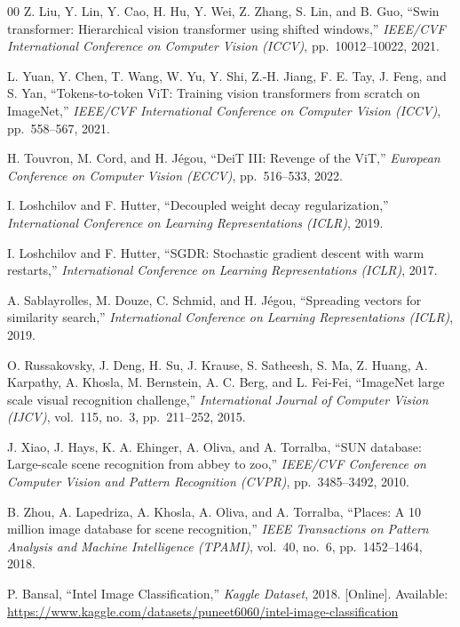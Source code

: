 \documentclass[journal]{IEEEtran}
\begin{document}
\begin{thebibliography}{00}
Z. Liu, Y. Lin, Y. Cao, H. Hu, Y. Wei, Z. Zhang, S. Lin, and B. Guo,
``Swin transformer: Hierarchical vision transformer using shifted windows,''
\textit{IEEE/CVF International Conference on Computer Vision (ICCV)},
pp.~10012--10022, 2021.

L. Yuan, Y. Chen, T. Wang, W. Yu, Y. Shi, Z.-H. Jiang, F. E. Tay, J. Feng, and S. Yan,
``Tokens-to-token ViT: Training vision transformers from scratch on ImageNet,''
\textit{IEEE/CVF International Conference on Computer Vision (ICCV)},
pp.~558--567, 2021.

H. Touvron, M. Cord, and H. Jégou,
``DeiT III: Revenge of the ViT,''
\textit{European Conference on Computer Vision (ECCV)},
pp.~516--533, 2022.

I. Loshchilov and F. Hutter,
``Decoupled weight decay regularization,''
\textit{International Conference on Learning Representations (ICLR)}, 2019.

I. Loshchilov and F. Hutter,
``SGDR: Stochastic gradient descent with warm restarts,''
\textit{International Conference on Learning Representations (ICLR)}, 2017.

A. Sablayrolles, M. Douze, C. Schmid, and H. Jégou,
``Spreading vectors for similarity search,''
\textit{International Conference on Learning Representations (ICLR)}, 2019.

O. Russakovsky, J. Deng, H. Su, J. Krause, S. Satheesh, S. Ma, Z. Huang,
A. Karpathy, A. Khosla, M. Bernstein, A. C. Berg, and L. Fei-Fei,
``ImageNet large scale visual recognition challenge,''
\textit{International Journal of Computer Vision (IJCV)},
vol.~115, no.~3, pp.~211--252, 2015.

J. Xiao, J. Hays, K. A. Ehinger, A. Oliva, and A. Torralba,
``SUN database: Large-scale scene recognition from abbey to zoo,''
\textit{IEEE/CVF Conference on Computer Vision and Pattern Recognition (CVPR)},
pp.~3485--3492, 2010.

B. Zhou, A. Lapedriza, A. Khosla, A. Oliva, and A. Torralba,
``Places: A 10 million image database for scene recognition,''
\textit{IEEE Transactions on Pattern Analysis and Machine Intelligence (TPAMI)},
vol.~40, no.~6, pp.~1452--1464, 2018.

P. Bansal,
``Intel Image Classification,''
\textit{Kaggle Dataset}, 2018. [Online]. Available:
\url{https://www.kaggle.com/datasets/puneet6060/intel-image-classification}

\end{thebibliography}
\end{document}
